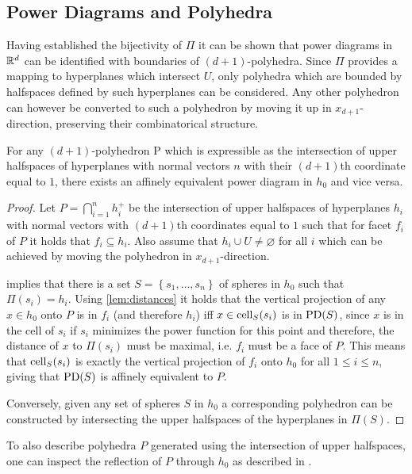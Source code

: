 \subsection{Power Diagrams and Polyhedra}
\label{sub:power_diagrams_and_polyhedra}
Having established the bijectivity of $\Pi$ it can be shown that power diagrams in $\mathbb{R}^d$ can be identified with boundaries of $(d+1)$-polyhedra.
Since $\Pi$ provides a mapping to hyperplanes which intersect $U$, only polyhedra which are bounded by halfspaces defined by such hyperplanes can be considered.
Any other polyhedron can however be converted to such a polyhedron by moving it up in $x_{d+1}$-direction, preserving their combinatorical structure.
\begin{theorem}
    \label{thm:equivalentpolyhedron}
    For any $(d+1)$-polyhedron P which is expressible as the intersection of upper halfspaces of hyperplanes with normal vectors $n$ with their $(d+1)$th coordinate equal to $1$, there exists an affinely equivalent power diagram in $h_0$ and vice versa.
\end{theorem}
\begin{proof}
    Let $P = \bigcap_{i=1}^n h_i^+$ be the intersection of upper halfspaces of hyperplanes $h_i$ with normal vectors with $(d+1)$th coordinates equal to $1$ such that for facet $f_i$ of $P$ it holds that $f_i \subseteq h_i$.
    Also assume that $h_i \cup U \neq \varnothing$ for all $i$ which can be achieved by moving the polyhedron in $x_{d+1}$-direction.

     implies that there is a set $S = \left\{ s_1, \dots, s_n \right\}$ of spheres in $h_0$ such that $\Pi(s_i) = h_i$.
    Using \cref{lem:distances} it holds that the vertical projection of any $x \in h_0$ onto $P$ is in $f_i$ (and therefore $h_i$) iff $x \in \operatorname{cell}_S(s_i)$ is in $\operatorname{PD}(S)$, since $x$ is in the cell of $s_i$ if $s_i$ minimizes the power function for this point and therefore, the distance of $x$ to $\Pi(s_i)$ must be maximal, i.e. $f_i$ must be a face of $P$.
    This means that $\operatorname{cell}_S(s_i)$ is exactly the vertical projection of $f_i$ onto $h_0$ for all $1 \leq i \leq n$, giving that $\operatorname{PD}(S)$ is affinely equivalent to $P$.

    Conversely, given any set of spheres $S$ in $h_0$ a corresponding polyhedron can be constructed by intersecting the upper halfspaces of the hyperplanes in $\Pi(S)$.
\end{proof}
To also describe polyhedra $P$ generated using the intersection of upper halfspaces, one can inspect the reflection of $P$ through $h_0$ as described in \cite{aurenhammer1987power}.

